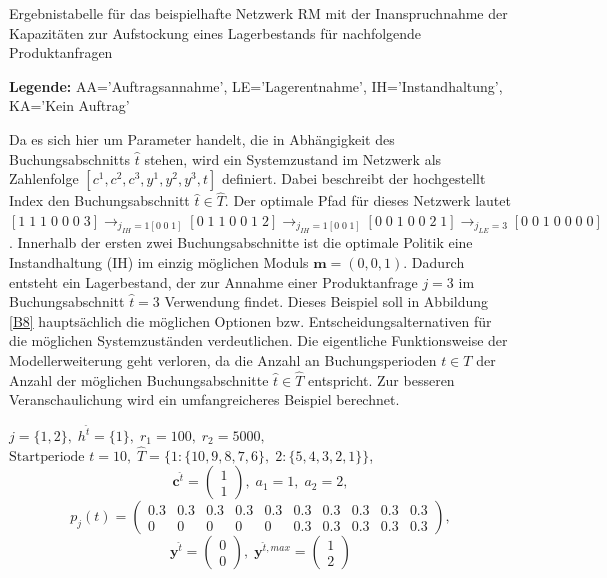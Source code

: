 \begin{table}
\begin{footnotesize}
    \caption{Ergebnistabelle für das beispielhafte Netzwerk RM mit der Inanspruchnahme der Kapazitäten zur Aufstockung eines Lagerbestands für nachfolgende Produktanfragen} \label{Tab8}
    \vspace*{3mm}
    \begin{center}
      \end{center}
    \begin{center}
          {\footnotesize \textbf{Legende:} AA='Auftragsannahme', LE='Lagerentnahme', IH='Instandhaltung', KA='Kein Auftrag'} 
      \end{center}
\end{footnotesize}
\end{table}

Da es sich hier um Parameter handelt, die in Abhängigkeit des Buchungsabschnitts $\hat{t}$ stehen, wird ein Systemzustand im Netzwerk als Zahlenfolge $[c^1,c^2,c^3,y^1,y^2,y^3,t]$ definiert. Dabei beschreibt der hochgestellt Index den Buchungsabschnitt $\hat{t}\in\hat{T}$. Der optimale Pfad für dieses Netzwerk lautet $[1\;1\;1\;0\;0\;0\;3] \rightarrow_{j_{IH}=1[0\;0\;1]} [0\;1\;1\;0\;0\;1\;2] \rightarrow_{j_{IH}=1[0\;0\;1]}  [0\;0\;1\;0\;0\;2\;1]  \rightarrow_{j_{LE}=3} [0\;0\;1\;0\;0\;0\;0]$. Innerhalb der ersten zwei Buchungsabschnitte ist die optimale Politik eine Instandhaltung (IH) im einzig möglichen Moduls $\textbf{m}=(0,0,1)$. Dadurch entsteht ein Lagerbestand, der zur Annahme einer Produktanfrage $j=3$ im Buchungsabschnitt $\hat{t}=3$ Verwendung findet. Dieses Beispiel soll in Abbildung \ref{B8} hauptsächlich die möglichen Optionen bzw. Entscheidungsalternativen für die möglichen Systemzuständen verdeutlichen. Die eigentliche Funktionsweise der Modellerweiterung geht verloren, da die Anzahl an Buchungsperioden $t\in T$ der Anzahl der möglichen Buchungsabschnitte $\hat{t}\in\hat{T}$ entspricht. Zur besseren Veranschaulichung wird ein umfangreicheres Beispiel berechnet.
\begin{center}
$j = \{1, 2\}, \; h^{\hat{t}} = \{1\}, \; r_{1} = 100, \; r_{2} = 5000,$ \\
$\text{Startperiode } t=10, \; \hat{T}= \{1: \{10,9,8,7,6\},\; 2: \{5,4,3,2,1\}\}  $,
\[\textbf{c}^{\hat{t}}=\begin{pmatrix} 1\\ 1  \end{pmatrix}, \;
    a_{1}=1, \;
       a_{2}=2,   \]
         \[ p_{j}(t)=
       \begin{pmatrix}
       0.3 & 0.3 & 0.3 & 0.3 & 0.3 & 0.3 & 0.3 & 0.3 & 0.3 & 0.3\\
0 & 0 & 0 & 0 & 0 & 0.3 & 0.3 & 0.3 & 0.3 & 0.3
\end{pmatrix}, 
  \]
  \[
    \textbf{y}^{\hat{t}}= \begin{pmatrix} 0\\ 0\end{pmatrix}, \;
    \textbf{y}^{\hat{t},max}=\begin{pmatrix} 1\\ 2  \end{pmatrix}
      \]
\end{center}

